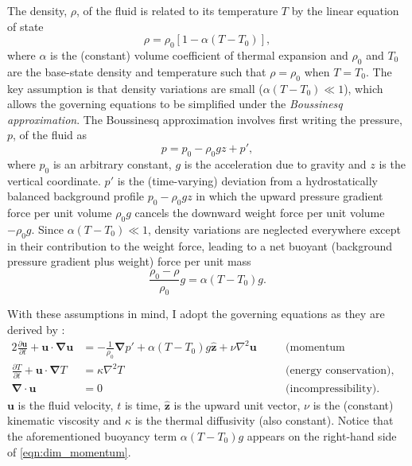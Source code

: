 \documentclass[titlepage]{article}
\numberwithin{equation}{section}
\newcommand{\pdiff}[2]{\frac{\partial #1}{\partial #2}}
\renewcommand\vec{\bm}
\newcommand{\uvec}[1]{\vec{\hat{#1}}}
\newcommand{\grad}{\vec{\nabla}}
\begin{document}
The density, $\rho$, of the fluid is related to its temperature $T$ by
the linear equation of state
\[
    \rho = \rho_0 [1 - \alpha(T - T_0)],
\]
where $\alpha$ is the (constant) volume coefficient of thermal expansion and
$\rho_0$ and $T_0$ are the base-state density and temperature such that $\rho =
\rho_0$ when $T = T_0$. The key assumption is that density variations are small
($\alpha (T - T_0) \ll 1$), which allows the governing equations to be
simplified under the \emph{Boussinesq approximation}. The Boussinesq
approximation involves first writing the pressure, $p$, of the fluid as
\[
    p = p_0 - \rho_0 gz + p',
\]
where $p_0$ is an arbitrary constant, $g$ is the acceleration due to gravity
and $z$ is the vertical coordinate. $p'$ is the (time-varying) deviation from
a hydrostatically balanced background profile $p_0 - \rho_0 gz$
in which the upward pressure gradient force per unit volume $\rho_0 g$ cancels
the downward weight force per unit volume $-\rho_0 g$. Since
$\alpha (T - T_0) \ll 1$, density variations are neglected everywhere except
in their contribution to the weight force, leading to a net buoyant
(background pressure gradient plus weight) force per unit mass
\[
    \frac{\rho_0 - \rho}{\rho_0} g = \alpha (T - T_0) g.
\]

With these assumptions in mind, I adopt the governing equations as they
are derived by \textcite{chandrasekhar1961}:
\begin{alignat}{2}
    \label{eqn:dim_momentum}
    \pdiff{\vec{u}}{t} + \vec{u} \cdot \grad \vec{u}
        &= -\frac{1}{\rho_0} \grad p' + \alpha (T - T_0) g \uvec{z}
        + \nu \nabla^2 \vec{u}
    &\quad& \text{(momentum conservation),} \\
    \label{eqn:dim_energy}
    \pdiff{T}{t} + \vec{u} \cdot \grad T
        &= \kappa \nabla^2 T
    && \text{(energy conservation), and} \\
    \label{eqn:dim_incompressible}
    \grad \cdot \vec{u} &= 0
    && \text{(incompressibility).}
\end{alignat}
$\vec{u}$ is the fluid velocity, $t$ is time, $\uvec{z}$ is the upward
unit vector, $\nu$ is the (constant) kinematic viscosity and $\kappa$ is
the thermal diffusivity (also constant). Notice that the aforementioned
buoyancy term $\alpha (T - T_0) g$ appears on the right-hand side of
\cref{eqn:dim_momentum}.
\end{document}
